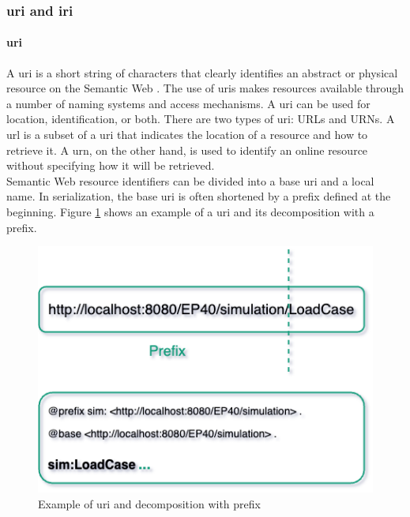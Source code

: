     \subsubsection{\acrshort{uri} and \acrshort{iri}}
        \paragraph{\acrfull{uri}}
        A \acrshort{uri} is a short string of characters that clearly identifies an abstract or physical resource on the Semantic Web \cite{de2016names}. The use of \acrshort{uri}s makes resources available through a number of naming systems and access mechanisms. A \acrshort{uri} can be used for location, identification, or both. There are two types of \acrshort{uri}: URLs and URNs. A \acrfull{url} is a subset of a \acrshort{uri} that indicates the location of a resource and how to retrieve it. A \acrfull{urn}, on the other hand, is used to identify an online resource without specifying how it will be retrieved.\\

        Semantic Web resource identifiers can be divided into a base \acrshort{uri} and a local name. In serialization, the base \acrshort{uri} is often shortened by a prefix defined at the beginning. Figure \ref{fig:uri-example} shows an example of a \acrshort{uri} and its decomposition with a prefix.\\

        \begin{figure}[h]
            \centering
            \includegraphics[scale=0.6]{images/Foundation-URI Decomposition.drawio.png}
            \caption{\label{fig:uri-example} Example of \acrshort{uri} and decomposition with prefix}
        \end{figure}


